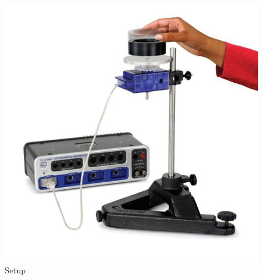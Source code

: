 \begin{figure}[H]
  \centering\includegraphics[width=15cm]{figSetup2.png}
  \caption{Setup}
  \label{fig:Setup}
\end{figure}

